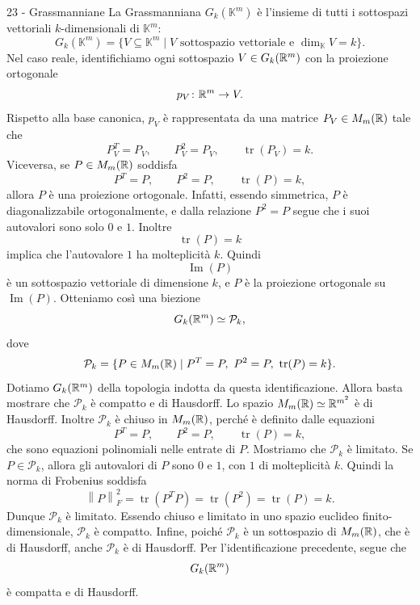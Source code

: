 \documentclass[a4paper]{article}
\begin{document}
\begin{snippetsolution}{23 - Grassmanniane}
    La Grassmanniana \(G_k(\mathbb{K}^m)\) è l'insieme di tutti i sottospazi vettoriali \(k\)-dimensionali di \(\mathbb{K}^m\):
    \[
        G_k(\mathbb{K}^m)
        =
        \{V\subseteq\mathbb{K}^m\mid V \text{ sottospazio vettoriale e } \dim_{\mathbb{K}}V=k\}.
    \]
    Nel caso reale, identifichiamo ogni sottospazio \(V\in G_k(\mathbb{R}^m)\) con la proiezione ortogonale
    \[
        p_V\colon\mathbb{R}^m\to V.
    \]
    Rispetto alla base canonica, \(p_V\) è rappresentata da una matrice \(P_V\in M_m(\mathbb{R})\) tale che
    \[
        P_V^T=P_V,
        \qquad
        P_V^2=P_V,
        \qquad
        \operatorname{tr}(P_V)=k.
    \]
    Viceversa, se \(P\in M_m(\mathbb{R})\) soddisfa
    \[
        P^T=P,
        \qquad
        P^2=P,
        \qquad
        \operatorname{tr}(P)=k,
    \]
    allora \(P\) è una proiezione ortogonale. Infatti, essendo simmetrica, \(P\) è diagonalizzabile ortogonalmente, e dalla relazione \(P^2=P\) segue che i suoi autovalori sono solo \(0\) e \(1\). Inoltre
    \[
        \operatorname{tr}(P)=k
    \]
    implica che l'autovalore \(1\) ha molteplicità \(k\). Quindi
    \[
        \operatorname{Im}(P)
    \]
    è un sottospazio vettoriale di dimensione \(k\), e \(P\) è la proiezione ortogonale su \(\operatorname{Im}(P)\).
    Otteniamo così una biezione
    \[
        G_k(\mathbb{R}^m)
        \simeq
        \mathcal{P}_k,
    \]
    dove
    \[
        \mathcal{P}_k=
        \{P\in M_m(\realnumbers)\mid P^T=P,\ P^2=P,\ \operatorname{tr}(P)=k\}.
    \]
    Dotiamo \(G_k(\mathbb{R}^m)\) della topologia indotta da questa identificazione. Allora basta mostrare che \(\mathcal{P}_k\) è compatto e di Hausdorff.
    Lo spazio \(M_m(\mathbb{R})\simeq\mathbb{R}^{m^2}\) è di Hausdorff. Inoltre \(\mathcal{P}_k\) è chiuso in \(M_m(\mathbb{R})\), perché è definito dalle equazioni
    \[
        P^T=P,
        \qquad
        P^2=P,
        \qquad
        \operatorname{tr}(P)=k,
    \]
    che sono equazioni polinomiali nelle entrate di \(P\).
    Mostriamo che \(\mathcal{P}_k\) è limitato. Se \(P\in\mathcal{P}_k\), allora gli autovalori di \(P\) sono \(0\) e \(1\), con \(1\) di molteplicità \(k\). Quindi la norma di Frobenius soddisfa
    \[
        \left\|P\right\|_F^2
        =
        \operatorname{tr}(P^TP)
        =
        \operatorname{tr}(P^2)
        =
        \operatorname{tr}(P)
        =
        k.
    \]
    Dunque \(\mathcal{P}_k\) è limitato. Essendo chiuso e limitato in uno spazio euclideo finito-dimensionale, \(\mathcal{P}_k\) è compatto.
    Infine, poiché \(\mathcal{P}_k\) è un sottospazio di \(M_m(\mathbb{R})\), che è di Hausdorff, anche \(\mathcal{P}_k\) è di Hausdorff. Per l'identificazione precedente, segue che
    \[
        G_k(\mathbb{R}^m)
    \]
    è compatta e di Hausdorff.
\end{snippetsolution}
\end{document}
